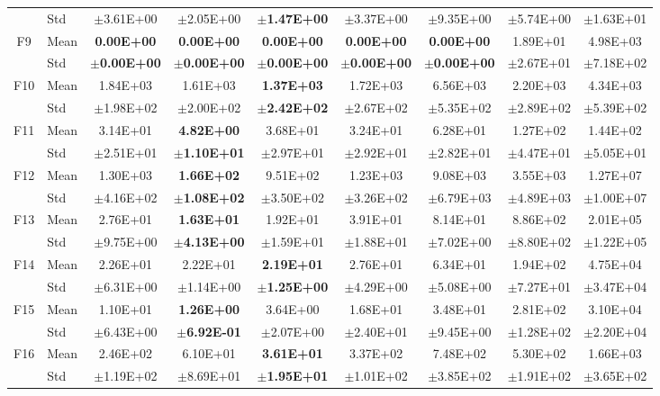 \begin{table}[htbp]
{\begin{tabular}{clccccccc}
 & Std & $\pm$3.61E+00 & $\pm$2.05E+00 & $\pm$\textbf{1.47E+00} & $\pm$3.37E+00 & $\pm$9.35E+00 & $\pm$5.74E+00 & $\pm$1.63E+01 \\
F9 & Mean & \textbf{0.00E+00} & \textbf{0.00E+00} & \textbf{0.00E+00} & \textbf{0.00E+00} & \textbf{0.00E+00} & 1.89E+01 & 4.98E+03 \\
 & Std & $\pm$\textbf{0.00E+00} & $\pm$\textbf{0.00E+00} & $\pm$\textbf{0.00E+00} & $\pm$\textbf{0.00E+00} & $\pm$\textbf{0.00E+00} & $\pm$2.67E+01 & $\pm$7.18E+02 \\
F10 & Mean & 1.84E+03 & 1.61E+03 & \textbf{1.37E+03} & 1.72E+03 & 6.56E+03 & 2.20E+03 & 4.34E+03 \\
 & Std & $\pm$1.98E+02 & $\pm$2.00E+02 & $\pm$\textbf{2.42E+02} & $\pm$2.67E+02 & $\pm$5.35E+02 & $\pm$2.89E+02 & $\pm$5.39E+02 \\
F11 & Mean & 3.14E+01 & \textbf{4.82E+00} & 3.68E+01 & 3.24E+01 & 6.28E+01 & 1.27E+02 & 1.44E+02 \\
 & Std & $\pm$2.51E+01 & $\pm$\textbf{1.10E+01} & $\pm$2.97E+01 & $\pm$2.92E+01 & $\pm$2.82E+01 & $\pm$4.47E+01 & $\pm$5.05E+01 \\
F12 & Mean & 1.30E+03 & \textbf{1.66E+02} & 9.51E+02 & 1.23E+03 & 9.08E+03 & 3.55E+03 & 1.27E+07 \\
 & Std & $\pm$4.16E+02 & $\pm$\textbf{1.08E+02} & $\pm$3.50E+02 & $\pm$3.26E+02 & $\pm$6.79E+03 & $\pm$4.89E+03 & $\pm$1.00E+07 \\
F13 & Mean & 2.76E+01 & \textbf{1.63E+01} & 1.92E+01 & 3.91E+01 & 8.14E+01 & 8.86E+02 & 2.01E+05 \\
 & Std & $\pm$9.75E+00 & $\pm$\textbf{4.13E+00} & $\pm$1.59E+01 & $\pm$1.88E+01 & $\pm$7.02E+00 & $\pm$8.80E+02 & $\pm$1.22E+05 \\
F14 & Mean & 2.26E+01 & 2.22E+01 & \textbf{2.19E+01} & 2.76E+01 & 6.34E+01 & 1.94E+02 & 4.75E+04 \\
 & Std & $\pm$6.31E+00 & $\pm$1.14E+00 & $\pm$\textbf{1.25E+00} & $\pm$4.29E+00 & $\pm$5.08E+00 & $\pm$7.27E+01 & $\pm$3.47E+04 \\
F15 & Mean & 1.10E+01 & \textbf{1.26E+00} & 3.64E+00 & 1.68E+01 & 3.48E+01 & 2.81E+02 & 3.10E+04 \\
 & Std & $\pm$6.43E+00 & $\pm$\textbf{6.92E-01} & $\pm$2.07E+00 & $\pm$2.40E+01 & $\pm$9.45E+00 & $\pm$1.28E+02 & $\pm$2.20E+04 \\
F16 & Mean & 2.46E+02 & 6.10E+01 & \textbf{3.61E+01} & 3.37E+02 & 7.48E+02 & 5.30E+02 & 1.66E+03 \\
 & Std & $\pm$1.19E+02 & $\pm$8.69E+01 & $\pm$\textbf{1.95E+01} & $\pm$1.01E+02 & $\pm$3.85E+02 & $\pm$1.91E+02 & $\pm$3.65E+02 \\

\end{tabular}}
\end{table}
